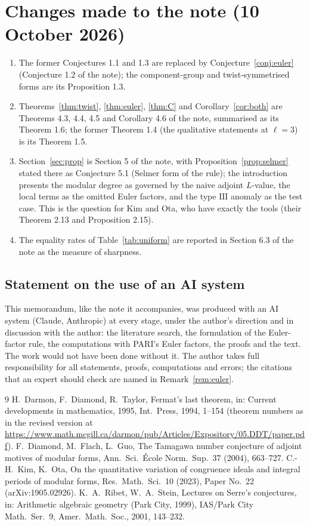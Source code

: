 \documentclass[11pt]{amsart}
\theoremstyle{definition}
\begin{document}
\section{Changes made to the note (10 October 2026)}\label{sec:rec}
\begin{enumerate}
\item The former Conjectures 1.1 and 1.3 are replaced by Conjecture~\ref{conj:euler} (Conjecture 1.2 of the note); the component-group and twist-symmetrised forms are its Proposition 1.3.
\item Theorems~\ref{thm:twist}, \ref{thm:euler}, \ref{thm:C} and Corollary~\ref{cor:both} are Theorems 4.3, 4.4, 4.5 and Corollary 4.6 of the note, summarised as its Theorem 1.6; the former Theorem 1.4 (the qualitative statements at $\ell=3$) is its Theorem 1.5.
\item Section~\ref{sec:prop} is Section 5 of the note, with Proposition~\ref{prop:selmer} stated there as Conjecture 5.1 (Selmer form of the rule); the introduction presents the modular degree as governed by the naive adjoint $L$-value, the local terms as the omitted Euler factors, and the type $\mathrm{III}$ anomaly as the test case. This is the question for Kim and Ota, who have exactly the tools (their Theorem 2.13 and Proposition 2.15).
\item The equality rates of Table~\ref{tab:uniform} are reported in Section 6.3 of the note as the measure of sharpness.
\end{enumerate}

\subsection*{Statement on the use of an AI system}
This memorandum, like the note it accompanies, was produced with an AI system (Claude, Anthropic) at every stage, under the author's direction and in discussion with the author: the literature search, the formulation of the Euler-factor rule, the computations with PARI's Euler factors, the proofs and the text. The work would not have been done without it. The author takes full responsibility for all statements, proofs, computations and errors; the citations that an expert should check are named in Remark~\ref{rem:euler}.

\begin{thebibliography}{9}
 H.~Darmon, F.~Diamond, R.~Taylor, Fermat's last theorem, in: Current developments in mathematics, 1995, Int.\ Press, 1994, 1--154 (theorem numbers as in the revised version at \url{https://www.math.mcgill.ca/darmon/pub/Articles/Expository/05.DDT/paper.pdf}).
 F.~Diamond, M.~Flach, L.~Guo, The Tamagawa number conjecture of adjoint motives of modular forms, Ann.\ Sci.\ \'Ecole Norm.\ Sup.\ 37 (2004), 663--727.
 C.-H.~Kim, K.~Ota, On the quantitative variation of congruence ideals and integral periods of modular forms, Res.\ Math.\ Sci.\ 10 (2023), Paper No.\ 22 (arXiv:1905.02926).
 K.~A.~Ribet, W.~A.~Stein, Lectures on Serre's conjectures, in: Arithmetic algebraic geometry (Park City, 1999), IAS/Park City Math.\ Ser.\ 9, Amer.\ Math.\ Soc., 2001, 143--232.
\end{thebibliography}
\end{document}
